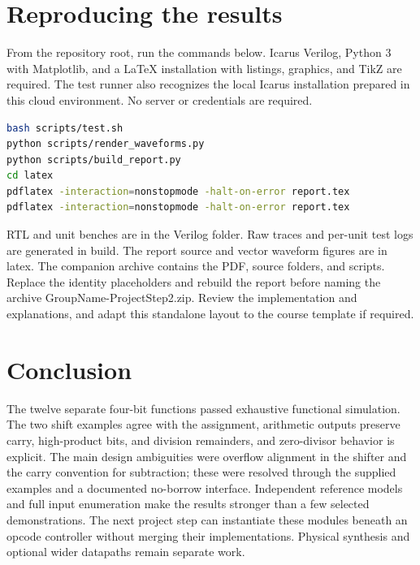 \documentclass[11pt]{article}
\begin{document}
\clearpage
\section{Reproducing the results}
From the repository root, run the commands below. Icarus Verilog, Python 3 with Matplotlib, and a LaTeX installation with listings, graphics, and TikZ are required. The test runner also recognizes the local Icarus installation prepared in this cloud environment. No server or credentials are required.
\begin{lstlisting}[language=bash,caption={Reproduce simulations and report}]
bash scripts/test.sh
python scripts/render_waveforms.py
python scripts/build_report.py
cd latex
pdflatex -interaction=nonstopmode -halt-on-error report.tex
pdflatex -interaction=nonstopmode -halt-on-error report.tex
\end{lstlisting}
RTL and unit benches are in the Verilog folder. Raw traces and per-unit test logs are generated in build. The report source and vector waveform figures are in latex. The companion archive contains the PDF, source folders, and scripts. Replace the identity placeholders and rebuild the report before naming the archive GroupName-ProjectStep2.zip. Review the implementation and explanations, and adapt this standalone layout to the course template if required.

\section{Conclusion}
The twelve separate four-bit functions passed exhaustive functional simulation. The two shift examples agree with the assignment, arithmetic outputs preserve carry, high-product bits, and division remainders, and zero-divisor behavior is explicit. The main design ambiguities were overflow alignment in the shifter and the carry convention for subtraction; these were resolved through the supplied examples and a documented no-borrow interface. Independent reference models and full input enumeration make the results stronger than a few selected demonstrations. The next project step can instantiate these modules beneath an opcode controller without merging their implementations. Physical synthesis and optional wider datapaths remain separate work.
\end{document}
